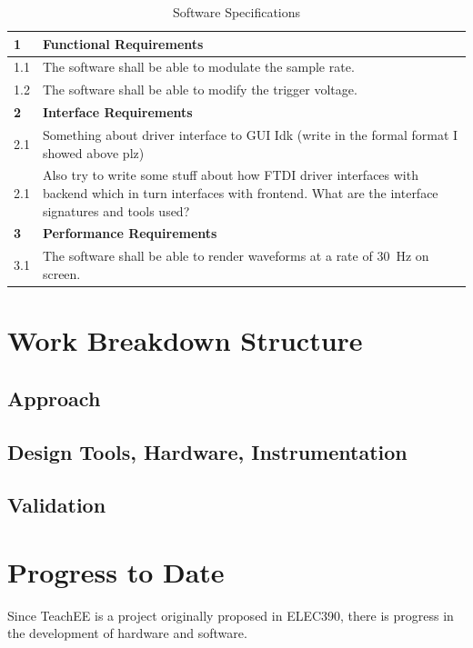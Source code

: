 \documentclass[letterpaper,12pt]{article}
\begin{document}
\begin{table}[h!]
    \caption{Software Specifications}
    \begin{tabularx}{\textwidth}{l|l}
        \textbf{1} & \textbf{Functional Requirements}\\
        \hline
        1.1 & The software shall be able to modulate the sample rate. \\
        1.2 & The software shall be able to modify the trigger voltage. \\
        \hline
        \textbf{2} & \textbf{Interface Requirements} \\
        \hline
        2.1 & Something about driver interface to GUI Idk (write in the formal format I showed above plz) \\
        2.1 & Also try to write some stuff about how FTDI driver interfaces with backend which in turn interfaces with frontend. What are the interface signatures and tools used? \\
        \hline
        \textbf{3} & \textbf{Performance Requirements} \\
        \hline
        3.1 & The software shall be able to render waveforms at a rate of \SI{30}{\hertz} on screen.
    \end{tabularx} 
\label{sw:specs-table}
\end{table}



\section{Work Breakdown Structure} %
\subsection{Approach} 
\subsection{Design Tools, Hardware, Instrumentation}
\subsection{Validation}

\section{Progress to Date} %
Since TeachEE is a project originally proposed in ELEC390, there is progress in
the development of hardware and software.
\end{document}
